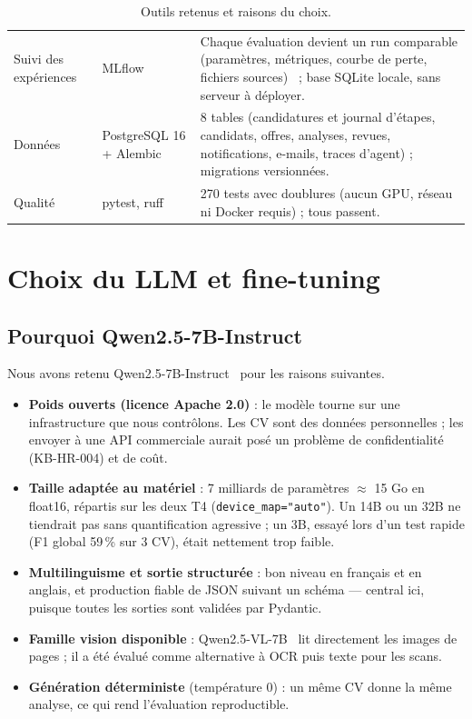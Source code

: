 \documentclass[11pt,a4paper]{report}
\newcommand{\kb}[1]{\textsf{#1}}
\begin{document}
\begin{table}[ht]
\begin{tabularx}{\textwidth}{L{2.3cm}L{3.9cm}Y}
Suivi des expériences & MLflow & Chaque évaluation devient un run comparable (paramètres, métriques, courbe de perte, fichiers sources)~\cite{mlflow} ; base SQLite locale, sans serveur à déployer.\\
Données & PostgreSQL 16 + Alembic & 8 tables (candidatures et journal d'étapes, candidats, offres, analyses, revues, notifications, e-mails, traces d'agent) ; migrations versionnées.\\
Qualité & pytest, ruff & 270 tests avec doublures (aucun GPU, réseau ni Docker requis) ; tous passent.\\
\bottomrule
\end{tabularx}
\caption{Outils retenus et raisons du choix.}
\label{tab:tools}
\end{table}

\chapter{Choix du LLM et fine-tuning}
\label{ch:llm}

\section{Pourquoi Qwen2.5-7B-Instruct}

Nous avons retenu Qwen2.5-7B-Instruct~\cite{qwen} pour les raisons suivantes.
\begin{itemize}
\item \textbf{Poids ouverts (licence Apache 2.0)} : le modèle tourne sur une infrastructure que nous contrôlons. Les CV sont des données personnelles ; les envoyer à une API commerciale aurait posé un problème de confidentialité (\kb{KB-HR-004}) et de coût.
\item \textbf{Taille adaptée au matériel} : 7 milliards de paramètres $\approx$ 15 Go en float16, répartis sur les deux T4 (\texttt{device\_map="auto"}). Un 14B ou un 32B ne tiendrait pas sans quantification agressive ; un 3B, essayé lors d'un test rapide (F1 global 59\,\% sur 3 CV), était nettement trop faible.
\item \textbf{Multilinguisme et sortie structurée} : bon niveau en français et en anglais, et production fiable de JSON suivant un schéma --- central ici, puisque toutes les sorties sont validées par Pydantic.
\item \textbf{Famille vision disponible} : Qwen2.5-VL-7B~\cite{qwenvl} lit directement les images de pages ; il a été évalué comme alternative à \og OCR puis texte\fg{} pour les scans.
\item \textbf{Génération déterministe} (température 0) : un même CV donne la même analyse, ce qui rend l'évaluation reproductible.
\end{itemize}
\end{document}
